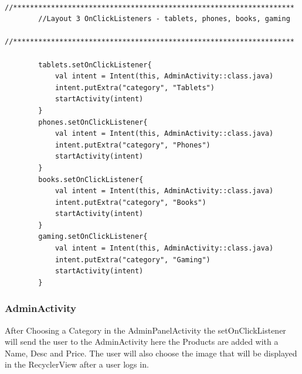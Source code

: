 \begin{verbatim}
        //*******************************************************************
        //Layout 3 OnClickListeners - tablets, phones, books, gaming
        //*******************************************************************

        tablets.setOnClickListener{
            val intent = Intent(this, AdminActivity::class.java)
            intent.putExtra("category", "Tablets")
            startActivity(intent)
        }
        phones.setOnClickListener{
            val intent = Intent(this, AdminActivity::class.java)
            intent.putExtra("category", "Phones")
            startActivity(intent)
        }
        books.setOnClickListener{
            val intent = Intent(this, AdminActivity::class.java)
            intent.putExtra("category", "Books")
            startActivity(intent)
        }
        gaming.setOnClickListener{
            val intent = Intent(this, AdminActivity::class.java)
            intent.putExtra("category", "Gaming")
            startActivity(intent)
        }
\end{verbatim}

\newpage
\subsubsection{AdminActivity}
After Choosing a Category in the AdminPanelActivity the setOnClickListener will send the user to the AdminActivity here the Products are added with a Name, Desc and Price. The user will also choose the image that will be displayed in the RecyclerView after a user logs in.

